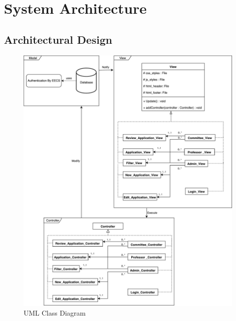 \documentclass[fontsize=12pt,paper=letter,twoside]{scrartcl}
\begin{document}

\newpage

\section{System Architecture} \label{sec:system_architecture}
\subsection{Architectural Design}
\begin{figure}[!htb]
\begin{center}
\includegraphics[width=.85\textwidth]{images/class_diagram.pdf}
\end{center}
\caption{UML Class Diagram}
\label{fig:uml_class_diagram}
\end{figure}

\newpage
\end{document}
